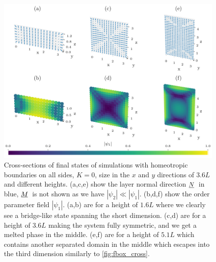 \documentclass[12pt]{article}
\newcommand{\suf}[2]{\stackunder[0.5pt]{\stackunder[1pt]{\ensuremath{#1}}{\rule{\widthof{\ensuremath{#2}}*\real{0.9}}{.1ex}}}{}}
\newcommand{\su}[1]{\suf{#1}{#1}}
\newcommand{\NN}{\ensuremath{\su{N}}}
\newcommand{\MM}{\ensuremath{\su{M}}}
\begin{document}
        \begin{figure}[t!]
            \begin{center}
                \includegraphics{figures/data_plots/3dfbox_r17_side.pdf}
            \end{center}
            \caption{
                Cross-sections of final states of simulations with homeotropic boundaries on all sides, $K=0$, size in the $x$ and $y$ directions of $3.6\si{L}$ and different heights.
                (a,c,e) show the layer normal direction \NN\ in blue, \MM\ is not shown as we have $|\psi_2| \ll |\psi_1|$.
                (b,d,f) show the order parameter field $|\psi_1|$.
                (a,b) are for a height of $1.6\si{L}$ where we clearly see a bridge-like state spanning the short dimension.
                (c,d) are for a height of $3.6\si{L}$ making the system fully symmetric, and we get a melted phase in the middle.
                (e,f) are for a height of $5.1\si{L}$ which contains another separated domain in the middle which escapes into the third dimension similarly to \cref{fig:fbox_cross}.
            }\label{fig:3dfbox_longside}
        \end{figure}
\end{document}
